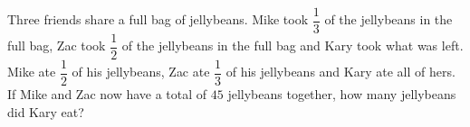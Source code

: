 Three friends share a full bag of jellybeans. Mike took $\dfrac{1}{3}$ of the jellybeans in the full bag, Zac took $\dfrac{1}{2}$ of the jellybeans in the full bag and Kary took what was left. Mike ate $\dfrac{1}{2}$ of his jellybeans, Zac ate $\dfrac{1}{3}$ of his jellybeans and Kary ate all of hers. If Mike and Zac now have a total of $45$ jellybeans together, how many jellybeans did Kary eat?
